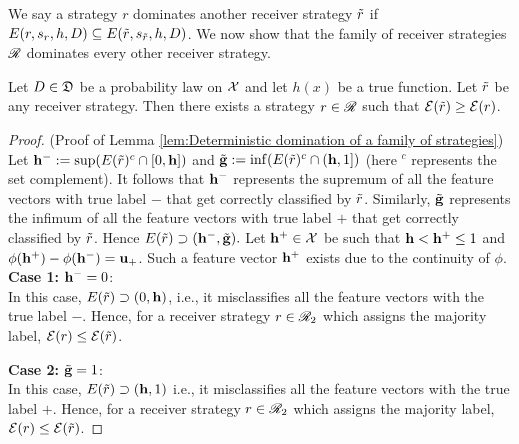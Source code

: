We say a strategy $r$ dominates another receiver strategy $\tilde{r}$ if $E(r,s_r,h,D) \subseteq E(\tilde{r},s_{\tilde{r}},h,D)$. We now show that the family of receiver strategies $\mathscr{R}$ dominates every other receiver strategy.

\begin{lem}\label{lem:Deterministic domination of a family of strategies}
	Let $D \in \mathfrak{D}$ be a probability law on $\mathcal{X}$ and let $h(x)$ be a true function. Let $\tilde{r}$ be any receiver strategy. Then there exists a strategy $r \in \mathscr{R}$ such that $\mathcal{E}(\tilde{r}) \geq \mathcal{E}(r)$.
\end{lem}

\begin{proof}(Proof of Lemma \ref{lem:Deterministic domination of a family of strategies})\label{proof:Deterministic domination of a family of strategies}\\
    Let $\mathbf{h^{-}} := \sup (E(\tilde{r})^c \cap [0,\mathbf{h}])$ and $\tilde{\mathbf{g}} := \inf(E(\tilde{r})^c \cap (\mathbf{h},1])$ (here $^c$ represents the set complement). It follows that $\mathbf{h^{-}}$ represents the supremum of all the feature vectors with true label $\minus$ that get correctly classified by $\tilde{r}$. Similarly, $\tilde{\mathbf{g}}$ represents the infimum of all the feature vectors with true label $\plus$ that get correctly classified by $\tilde{r}$. Hence $E(\tilde{r}) \supset (\mathbf{h^{-}},\tilde{\mathbf{g}}).$ Let $\mathbf{h^{+}} \in \mathcal{X}$ be such that $\mathbf{h} < \mathbf{h^{+}} \leq 1$ and $\phi(\mathbf{h^{+}}) - \phi(\mathbf{h^{-}}) = \mathbf{u_+}$. Such a feature vector $\mathbf{h^{+}}$ exists due to the continuity of $\phi$.\\
	\textbf{Case 1: }\label{lem:Deterministic domination of a family of strategies:a}{$\mathbf{h^{-}} = 0$:}\\
		In this case, $E(\tilde{r}) \supset (0,\mathbf{h})$, i.e., it misclassifies all the feature vectors with the true label $\minus$. Hence, for a receiver strategy $r \in \mathscr{R}_2$ which assigns the majority label, $\mathcal{E}(r) \leq \mathcal{E}(\tilde{r})$.


\textbf{Case 2: }\label{lem:Deterministic domination of a family of strategies:b}{$\tilde{\mathbf{g}} = 1$:}\\
		In this case, $E(\tilde{r}) \supset (\mathbf{h},1)$ i.e., it misclassifies all the feature vectors with the true label $\plus$. Hence, for a receiver strategy $r \in \mathscr{R}_2$ which assigns the majority label, $\mathcal{E}(r) \leq \mathcal{E}(\tilde{r})$.




\end{proof}
